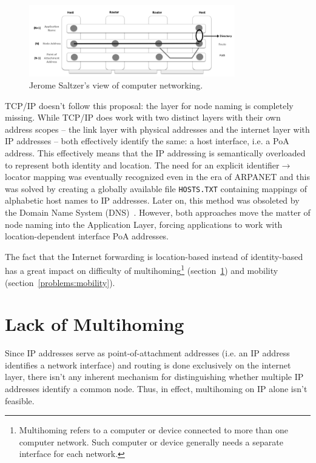         \begin{figure}[H]
            \begin{center}
                \includegraphics[width=0.8\textwidth]{fig/problems_saltzer.png}
              \caption{Jerome Saltzer's view of computer networking.}
              \label{fig:saltzer}
            \end{center}
        \end{figure}

        TCP/IP doesn't follow this proposal: the layer for node naming is completely missing. While TCP/IP does work with two distinct layers with their own address scopes -- the link layer with physical addresses and the internet layer with IP addresses -- both effectively identify the same: a host interface, i.e. a PoA address. This effectively means that the IP addressing is semantically overloaded to represent both identity and location. The need for an explicit identifier$\rightarrow$locator mapping was eventually recognized even in the era of ARPANET and this was solved by creating a globally available file \texttt{HOSTS.TXT} containing mappings of alphabetic host names to IP addresses. Later on, this method was obsoleted by the Domain Name System (DNS)~\cite{rfc1034}. However, both approaches move the matter of node naming into the Application Layer, forcing applications to work with location-dependent interface PoA addresses.

        The fact that the Internet forwarding is location-based instead of identity-based has a great impact on difficulty of multihoming\footnote{Multihoming refers to a computer or device connected to more than one computer network. Such computer or device generally needs a separate interface for each network.} (section~\ref{problems:multihoming}) and mobility (section~\ref{problems:mobility}).

    \section{Lack of Multihoming}\label{problems:multihoming}

        Since IP addresses serve as point-of-attachment addresses (i.e. an IP address identifies a network interface) and routing is done exclusively on the internet layer, there isn't any inherent mechanism for distinguishing whether multiple IP addresses identify a common node. Thus, in effect, multihoming on IP alone isn't feasible.

